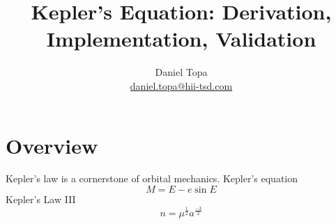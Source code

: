 \documentclass[10pt, oneside]{article}   	%
\title{Kepler's Equation: Derivation, Implementation, Validation}
\author{Daniel Topa\\\href{mailto:daniel.topa@hii-tsd.com}{daniel.topa@hii-tsd.com}}
\affil{\href{https://hii.com/what-we-do/divisions/mission-technologies/}{Mission Technologies}
\\Huntington Ingalls Industries
\\Kirtland AFB, NM}
\begin{document}
\maketitle
{}
\tableofcontents

\section{Overview}
Kepler's law is a cornerstone of orbital mechanics.
Kepler's equation
\begin{equation}
	M = E - e \sin E
\label{eq:kepler-law}
\end{equation}
Kepler's Law III
\begin{equation}
	n = \mu^{\tfrac{1}{2}} a^{\tfrac{-3}{2}}
\label{eq:kepler-law-III}
\end{equation}


		
		
		
		\appendix
		
				
		\printbibliography
			
\end{document}
